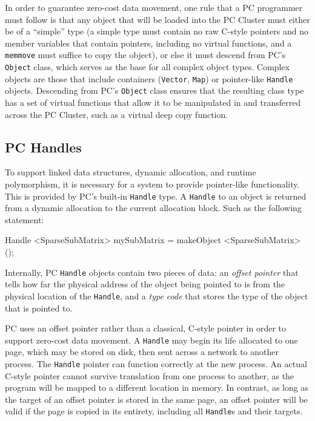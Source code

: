 In order to guarantee zero-cost data movement,
one rule that a PC programmer must follow is that any object that will
be loaded into the PC Cluster must either be of a ``simple'' type (a simple type
must contain no raw C-style pointers and no member variables that contain pointers, including no 
virtual functions, and a \texttt{memmove}
must suffice to copy the object), or else it must descend from PC's \texttt{Object} class, which serves as the base for all complex object types.
Complex objects are those that include containers (\texttt{Vector}, \texttt{Map}) or pointer-like \texttt{Handle} objects.  Descending from PC's \texttt{Object} class
ensures that the resulting class type has a set of virtual functions
that allow it to be manipulated in and transferred across the PC Cluster, 
such as a virtual deep copy function.  

\subsection{PC Handles}

To support linked data structures, dynamic allocation, and runtime polymorphism, it is necessary for a 
system to provide pointer-like functionality.  This is provided by PC's built-in \texttt{Handle} type.  
A \texttt{Handle} to an object is returned from a dynamic allocation to the current allocation block.
Such as the following statement:

\begin{codesmall}
Handle <SparseSubMatrix> mySubMatrix 
     = makeObject <SparseSubMatrix> ();
\end{codesmall}

Internally, PC \texttt{Handle} objects contain two pieces of data: an \emph{offset pointer} that tells how far
the physical address of the object being pointed to is from the physical location of the 
\texttt{Handle}, and a \emph{type code} that stores the type of the
object that is pointed to.  

PC uses an offset pointer rather than a classical, C-style pointer in order to support
zero-cost data movement.  
A \texttt{Handle} may begin its life allocated
to one page, which may be stored on disk, then sent across a network
to another process.  The \texttt{Handle} pointer
can function correctly at the new process.  
An actual C-style pointer
cannot survive translation from one process to another, as the program will be mapped to a different location in memory.
In contrast, as long as the target of an offset pointer is stored in the same page, an offset pointer will be valid if the
page is copied in its entirety, including all \texttt{Handle}s and their targets.

